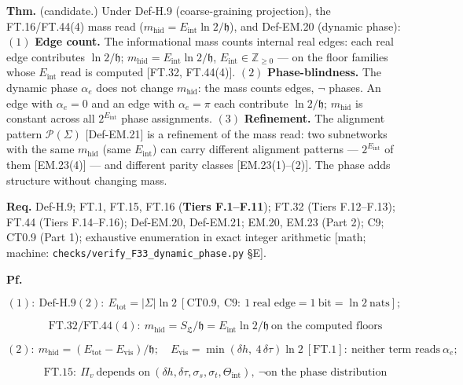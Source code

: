 \begin{theorem}\label{tag:FT-100}
\textbf{Thm.} (candidate.) Under Def-H.9 (coarse-graining projection), the FT.16/FT.44(4) mass read ($m_{\mathrm{hid}}=E_{\mathrm{int}}\ln2/\mathfrak h$), and Def-EM.20 (dynamic phase): $(1)$ \textbf{Edge count.} The informational mass counts internal real edges: each real edge contributes $\ln2/\mathfrak h$; $m_{\mathrm{hid}}=E_{\mathrm{int}}\ln2/\mathfrak h$, $E_{\mathrm{int}}\in\mathbb Z_{\ge0}$ — on the floor families whose $E_{\mathrm{int}}$ read is computed [FT.32, FT.44(4)]. $(2)$ \textbf{Phase-blindness.} The dynamic phase $\alpha_e$ does not change $m_{\mathrm{hid}}$: the mass counts edges, $\neg$ phases. An edge with $\alpha_e=0$ and an edge with $\alpha_e=\pi$ each contribute $\ln2/\mathfrak h$; $m_{\mathrm{hid}}$ is constant across all $2^{E_{\mathrm{int}}}$ phase assignments. $(3)$ \textbf{Refinement.} The alignment pattern $\mathcal P(\Sigma)$ [Def-EM.21] is a refinement of the mass read: two subnetworks with the same $m_{\mathrm{hid}}$ (same $E_{\mathrm{int}}$) can carry different alignment patterns — $2^{E_{\mathrm{int}}}$ of them [EM.23(4)] — and different parity classes [EM.23(1)–(2)]. The phase adds structure without changing mass.

\textbf{Req.} Def-H.9; FT.1, FT.15, FT.16 (\textbf{Tiers F.1–F.11}); FT.32 (Tiers F.12–F.13); FT.44 (Tiers F.14–F.16); Def-EM.20, Def-EM.21; EM.20, EM.23 (Part 2); C9; CT0.9 (Part 1); exhaustive enumeration in exact integer arithmetic [math; machine: \texttt{checks/\allowbreak{}verify\_\allowbreak{}F33\_\allowbreak{}dynamic\_\allowbreak{}phase.py} §E].

\textbf{Pf.}

\[
(1):\ \mathrm{Def\text{-}H.9}(2):\ E_{\mathrm{tot}}=|\Sigma|\ln2\ [\mathrm{CT0.9},\ \mathrm{C9}:\ 1\ \text{real edge}=1\ \text{bit}=\ln2\ \text{nats}];
\]

\[
\qquad \mathrm{FT.32}/\mathrm{FT.44}(4):\ m_{\mathrm{hid}}=S_{\mathfrak L}/\mathfrak h=E_{\mathrm{int}}\ln2/\mathfrak h\ \text{on the computed floors}
\]

\[
(2):\ m_{\mathrm{hid}}=(E_{\mathrm{tot}}-E_{\mathrm{vis}})/\mathfrak h;\quad E_{\mathrm{vis}}=\min(\delta h,\ 4\,\delta\tau)\ln2\ [\mathrm{FT.1}]:\ \text{neither term reads}\ \alpha_e;
\]

\[
\qquad \mathrm{FT.15}:\ \Pi_v\ \text{depends on}\ (\delta h,\delta\tau,\sigma_s,\sigma_t,\Theta_{\mathrm{int}}),\ \neg\text{on the phase distribution}
\]


\end{theorem}
